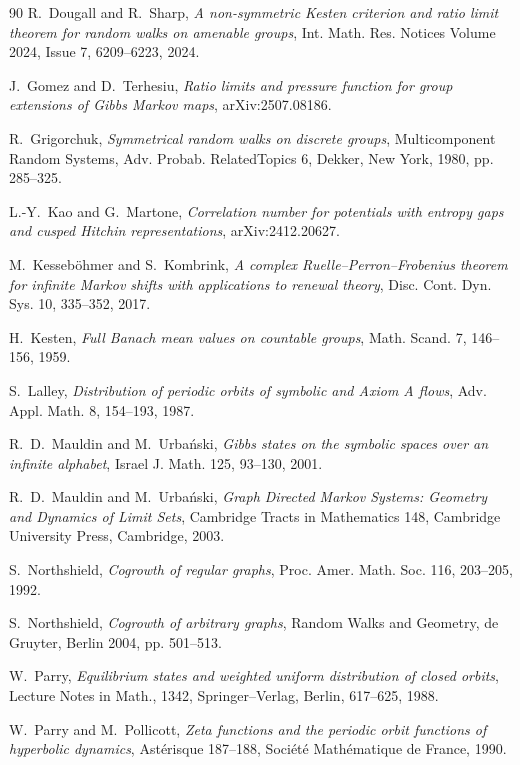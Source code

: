 \documentclass[11pt,letterpaper]{amsart}
\theoremstyle{definition}
\numberwithin{equation}{section}
\numberwithin{theorem}{section}
\begin{document}
\begin{thebibliography}{90}
R.~Dougall and R.~Sharp,
\emph{A non-symmetric Kesten criterion and ratio limit theorem for random walks on amenable groups},
Int. Math. Res. Notices Volume 2024, Issue 7, 6209--6223, 2024.

J.~Gomez and D.~Terhesiu,
\emph{Ratio limits and pressure function for group extensions of Gibbs Markov maps},
arXiv:2507.08186.

R.~Grigorchuk,
\emph{Symmetrical random walks on discrete groups},
Multicomponent Random Systems, Adv. Probab. RelatedTopics 6, Dekker, New York, 1980, pp. 285--325.



L.-Y.~Kao and G.~Martone,
\emph{Correlation number for potentials with entropy gaps and cusped Hitchin representations},
arXiv:2412.20627.

M.~Kesseb\"ohmer and S.~Kombrink,
\emph{A complex Ruelle--Perron--Frobenius theorem for infinite Markov shifts with applications
to renewal theory},
Disc. Cont. Dyn. Sys. 10, 335--352, 2017.

H.~Kesten,
\emph{Full Banach mean values on countable groups},
Math. Scand. 7, 146--156, 1959. 




S.~Lalley,
\emph{Distribution of periodic orbits of symbolic and Axiom A flows},
Adv. Appl. Math. 8, 154--193, 1987.


R.~D.~Mauldin and M.~Urba\'nski,
\emph{Gibbs states on the symbolic spaces over an infinite alphabet},
Israel J. Math. 125, 93--130, 2001.

R.~D.~Mauldin and M.~Urba\'nski,
\emph{Graph Directed Markov Systems: Geometry and Dynamics of Limit Sets},
Cambridge Tracts in Mathematics 148, Cambridge University Press, Cambridge, 2003.

S.~Northshield,
\emph{Cogrowth of regular graphs},
Proc. Amer. Math. Soc. 116, 203--205, 1992.

S.~Northshield,
\emph{Cogrowth of arbitrary graphs},
Random Walks and Geometry, de Gruyter, Berlin 2004, pp. 501--513.

W.~Parry,
\emph{Equilibrium states and weighted uniform distribution of closed orbits}, Lecture Notes in Math., 1342, Springer--Verlag, Berlin, 617--625, 1988.

W.~Parry and M.~Pollicott,
\emph{Zeta functions and the periodic orbit functions of hyperbolic dynamics},
Ast\'erisque 187--188, Soci\'et\'e Math\'ematique de France, 1990.




\end{thebibliography}
\end{document}
